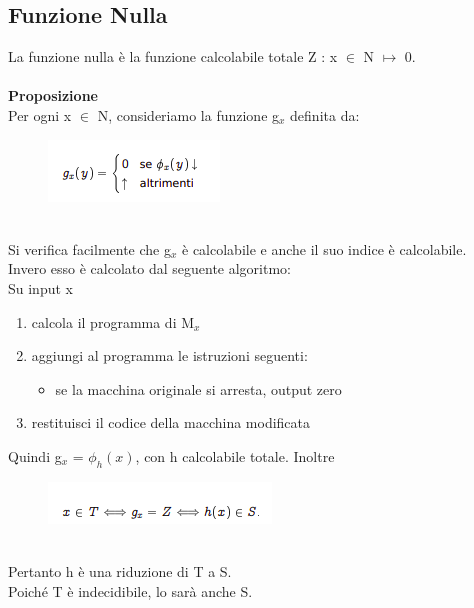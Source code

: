 \subsection{Funzione Nulla}
La funzione nulla è la funzione calcolabile totale Z : x $\in$ N $\mapsto$ 0.\\\\
\textbf{Proposizione}\\
Per ogni x $\in$ N, consideriamo la funzione g$_x$ definita da:\\
\begin{figure}[htp]
    \centering
    \includegraphics[scale=1]{tesi_stile/img/nulla.png}
\end{figure}\\
Si verifica facilmente che g$_x$ è calcolabile e anche il suo indice è calcolabile.\\
Invero esso è calcolato dal seguente algoritmo:\\
Su input x
\begin{center}
    \begin{enumerate}
        \item calcola il programma di M$_x$
        
        \item aggiungi al programma le istruzioni seguenti:
        \begin{itemize}
            \item se la macchina originale si arresta, output zero
        \end{itemize}
        \item restituisci il codice della macchina modificata
    \end{enumerate}
\end{center}
Quindi g$_x$ = $\phi_h(x)$, con h calcolabile totale. Inoltre\\
\begin{figure}[htp]
    \centering
    \includegraphics[scale=1]{tesi_stile/img/nulla2.png}
\end{figure}\\
Pertanto h è una riduzione di T a S.\\
Poiché T è indecidibile, lo sarà anche S.
\newpage
